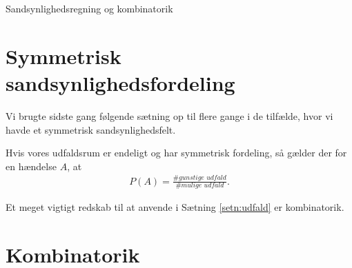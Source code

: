 
\begin{center}
\Huge
Sandsynlighedsregning og kombinatorik
\end{center}
\section*{Symmetrisk sandsynlighedsfordeling}

Vi brugte sidste gang følgende sætning op til flere gange i de tilfælde, hvor vi havde et symmetrisk sandsynlighedsfelt.
\begin{setn}\label{setn:udfald}
Hvis vores udfaldsrum er endeligt og har symmetrisk fordeling, så gælder der for en hændelse $A$, at
\begin{align*}
P(A) = \frac{\# \textit{gunstige udfald}}{\#  \textit{mulige udfald}}.
\end{align*}
\end{setn}
Et meget vigtigt redskab til at anvende i Sætning \ref{setn:udfald} er kombinatorik.
\section*{Kombinatorik}

